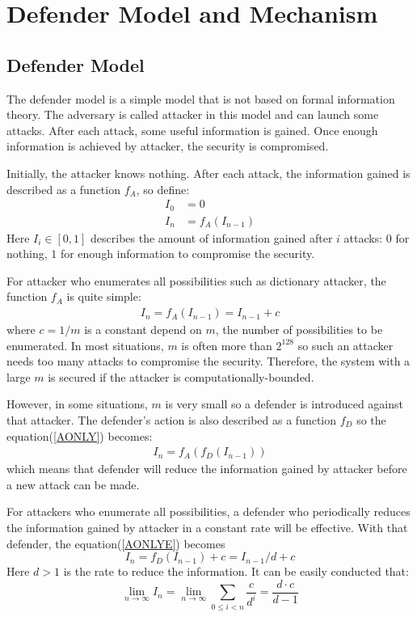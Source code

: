 \documentclass[10pt, conference, compsocconf]{IEEEtran}
\begin{document}
\section{Defender Model and Mechanism}\label{sec_def}
	\subsection{Defender Model}
		The defender model is a simple model that
		is not based on formal information theory.
		The adversary is called attacker in this model
		and can launch some attacks. After
		each attack, some useful information is gained.
		Once enough information is achieved by attacker, 
		the security is compromised.
		
		Initially, the attacker knows nothing. After
		each attack, the information gained
		is described as a function $f_A$, so define:
		\begin{align}
			I_0 &= 0\\
			I_n &= f_A(I_{n-1})\label{AONLY}
		\end{align}
		Here $I_i \in [0, 1]$ describes the amount of information
		gained after $i$ attacks: $0$ for nothing, $1$ for enough
		information to compromise the security.
		
		For attacker who enumerates all possibilities such
		as dictionary attacker, the
		function $f_A$ is quite simple:
		\begin{align}
			I_n = f_A(I_{n-1}) = I_{n-1}+c\label{AONLYE}
		\end{align}
		where $c = 1/m$ is a constant depend on $m$,
		the number of possibilities to be enumerated. 
		In most situations, $m$ is often more
		than $2^{128}$ so such an attacker needs too many 
		attacks to compromise the security. Therefore, the system with
		a large $m$ is secured if the attacker is computationally-bounded.
		
		However, in some situations, $m$ is very small so
		a defender is introduced against that attacker. 
		The defender's action is also described as a function $f_D$
		so the equation(\ref{AONLY}) becomes:
		\begin{align}
			I_n = f_A(f_D(I_{n-1}))
		\end{align}
		which means that defender will reduce the information
		gained by attacker before a new attack can be made.
		
		For attackers who enumerate all possibilities,
		a defender 
		who periodically reduces the information gained by
		attacker in a constant rate will be effective. With
		that defender,
		the equation(\ref{AONLYE}) becomes
		\begin{equation}
			I_n = f_D(I_{n-1})+c = I_{n-1}/d+c
		\end{equation}
		Here $d > 1$ is the rate to reduce the information.
		It can be easily conducted that:
		\begin{equation*}
			\lim_{n \rightarrow \infty} I_n = \lim_{n \rightarrow \infty} \sum_{0 \leq i < n} \frac{c}{d^i}
				= \frac{d \cdot c}{d-1}
		\end{equation*}
		
\end{document}
